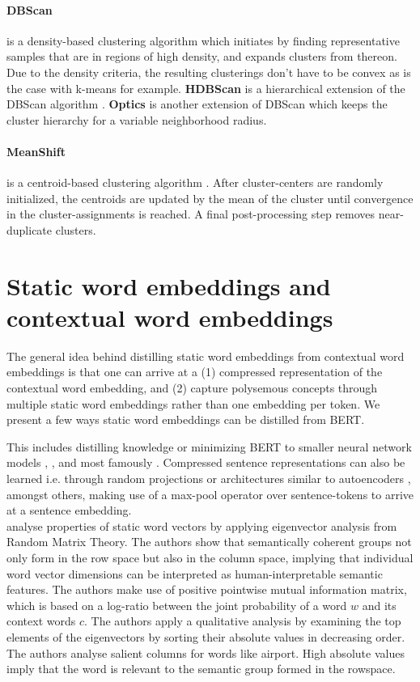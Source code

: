 \documentclass[a4paper,12pt,oneside,openright]{report}
\begin{document}
\paragraph{DBScan} is a density-based clustering algorithm \cite{ester96} which initiates by finding representative samples that are in regions of high density, and expands clusters from thereon.
Due to the density criteria, the resulting clusterings don't have to be convex as is the case with k-means for example. \textbf{HDBScan} is a hierarchical extension of the DBScan algorithm \cite{campello13}. \textbf{Optics} \cite{mihael99} is another extension of DBScan which keeps the cluster hierarchy for a variable neighborhood radius.

\paragraph{MeanShift} is a centroid-based clustering algorithm \cite{comaniciu02}.
After cluster-centers are randomly initialized, the centroids are updated by the mean of the cluster until convergence in the cluster-assignments is reached.
A final post-processing step removes near-duplicate clusters.


\section{Static word embeddings and contextual word embeddings}

The general idea behind distilling static word embeddings from contextual word embeddings is that one can arrive at a (1) compressed representation of the contextual word embedding, and (2) capture polysemous concepts through multiple static word embeddings rather than one embedding per token. 
We present a few ways static word embeddings can be distilled from BERT.

This includes distilling knowledge or minimizing BERT to smaller neural network models \cite{tang19}, \cite{tsai19}, and most famously \cite{sanh19}.
Compressed sentence representations can also be learned i.e. through random projections or architectures similar to autoencoders \cite{shen19}, amongst others, making use of a max-pool operator over sentence-tokens to arrive at a sentence embedding. \\

\cite{shin18} analyse properties of static word vectors by applying eigenvector analysis from Random Matrix Theory.
The authors show that semantically coherent groups not only form in the row space but also in the column space, implying that individual word vector dimensions can be interpreted as human-interpretable semantic features.
The authors make use of positive pointwise mutual information matrix, which is based on a log-ratio between the joint probability of a word $w$ and its context words $c$.
The authors apply a qualitative analysis by examining the top elements of the eigenvectors by sorting their absolute values in decreasing order.
The authors analyse salient columns for words like airport.
High absolute values imply that the word is relevant to the semantic group formed in the rowspace.
\end{document}
